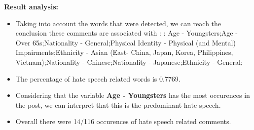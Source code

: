 \documentclass[11pt]{article}
\begin{document}
\textbf{\Large Result analysis:}

\begin{itemize}\item Taking into account the words that were detected, we can reach the conclusion these comments are associated with : : Age - Youngsters;Age - Over 65s;Nationality - General;Physical Identity - Physical (and Mental) Impairments;Ethnicity - Asian (East- China, Japan, Korea, Philippines, Vietnam);Nationality - Chinese;Nationality - Japanese;Ethnicity - General;%

\item The percentage of hate speech related words is 0.7769.

\item Considering that the variable \textbf{Age - Youngsters} has the most occurences in the post, we can interpret that this is the predominant hate speech.

\item Overall there were 14/116 occurences of hate speech related comments.\end{itemize}
\end{document}
